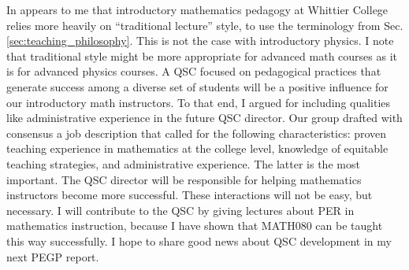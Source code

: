 \documentclass[../../../main.tex]{subfiles}
\begin{document}
In appears to me that introductory mathematics pedagogy at Whittier College relies more heavily on ``traditional lecture'' style, to use the terminology from Sec. \ref{sec:teaching_philosophy}.  This is not the case with introductory physics.  I note that traditional style might be more appropriate for advanced math courses as it is for advanced physics courses.  A QSC focused on pedagogical practices that generate success among a diverse set of students will be a positive influence for our introductory math instructors.  To that end, I argued for including qualities like administrative experience in the future QSC director.  Our group drafted with consensus a job description that called for the following characteristics: proven teaching experience in mathematics at the college level, knowledge of equitable teaching strategies, and administrative experience.  The latter is the most important.  The QSC director will be responsible for helping mathematics instructors become more successful.  These interactions will not be easy, but necessary.  I will contribute to the QSC by giving lectures about PER in mathematics instruction, because I have shown that MATH080 can be taught this way successfully.  I hope to share good news about QSC development in my next PEGP report.
\end{document}
